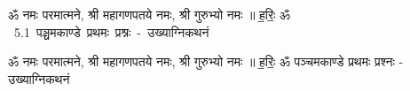 \documentclass[17pt]{extarticle}
\begin{document}
\begin{titlepage}
    \begin{center}
 
\begin{sanskrit}
    { \Large
    ॐ नमः परमात्मने, श्री महागणपतये नमः, श्री गुरुभ्यो नमः ॥ ह॒रिः॒ ॐ 
    }
    \\
    \vspace{2.5cm}
    \mbox{ \Huge
    5.1      पञ्चमकाण्डे प्रथमः प्रश्नः - उख्याग्निकथनं   }
\end{sanskrit}
\end{center}

\end{titlepage}
\tableofcontents

ॐ नमः परमात्मने, श्री महागणपतये नमः, श्री गुरुभ्यो नमः ॥ ह॒रिः॒ ॐ       पञ्चमकाण्डे प्रथमः प्रश्नः - उख्याग्निकथनं \newline

\end{document}
